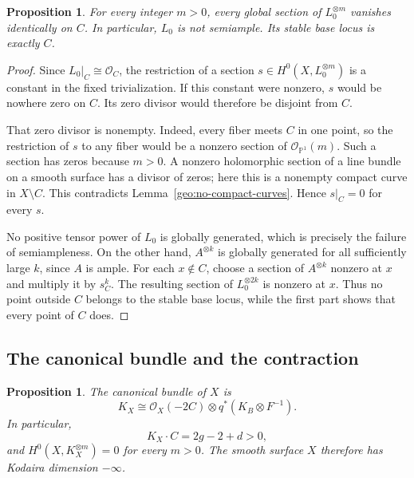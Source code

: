\documentclass[11pt,a4paper]{article}
\numberwithin{equation}{section}
\newtheorem{proposition}[theorem]{Proposition}
\theoremstyle{definition}
\theoremstyle{remark}
\renewcommand{\P}{\mathbb P}
\newcommand{\OO}{\mathcal O}
\begin{document}
\begin{proposition}\label{geo:not-semiample}
For every integer $m>0$, every global section of $L_0^{\otimes m}$
vanishes identically on $C$.  In particular, $L_0$ is not semiample.
Its stable base locus is exactly $C$.
\end{proposition}

\begin{proof}
Since $L_0|_C\cong\OO_C$, the restriction of a section
$s\in H^0(X,L_0^{\otimes m})$ is a constant in the fixed
trivialization.  If this constant were nonzero, $s$ would be
nowhere zero on $C$.  Its zero divisor would therefore be disjoint
from $C$.

That zero divisor is nonempty.  Indeed, every fiber meets $C$ in
one point, so the restriction of $s$ to any fiber would be a
nonzero section of $\OO_{\P^1}(m)$.  Such a section has zeros
because $m>0$.  A nonzero holomorphic section of a line bundle
on a smooth surface has a divisor of zeros; here this is a
nonempty compact curve in $X\setminus C$.  This contradicts
Lemma~\ref{geo:no-compact-curves}.  Hence $s|_C=0$ for every $s$.

No positive tensor power of $L_0$ is globally generated, which is
precisely the failure of semiampleness.  On the other hand,
$A^{\otimes k}$ is globally generated for all sufficiently large
$k$, since $A$ is ample.  For each $x\notin C$, choose a section of
$A^{\otimes k}$ nonzero at $x$ and multiply it by $s_C^k$.
The resulting section of $L_0^{\otimes2k}$ is nonzero at $x$.
Thus no point outside $C$ belongs to the stable base locus, while
the first part shows that every point of $C$ does.
\end{proof}

\subsection{The canonical bundle and the contraction}

\begin{proposition}\label{geo:canonical}
The canonical bundle of $X$ is
\begin{equation}\label{geo:canonical-formula}
  K_X\cong\OO_X(-2C)\otimes q^*(K_B\otimes F^{-1}).
\end{equation}
In particular,
\[
  K_X\cdot C=2g-2+d>0,
\]
and $H^0(X,K_X^{\otimes m})=0$ for every $m>0$.  The smooth
surface $X$ therefore has Kodaira dimension $-\infty$.
\end{proposition}
\end{document}
